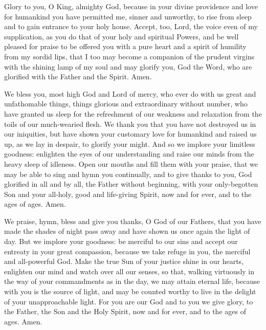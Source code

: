 
Glory to you, O King, almighty God, because in your divine providence and love for humankind you have permitted me, sinner and unworthy, to rise from sleep and to gain entrance to your holy house. Accept, too, Lord, the voice even of my supplication, as you do that of your holy and spiritual Powers, and be well pleased for praise to be offered you with a pure heart and a spirit of humility from my sordid lips, that I too may become a companion of the prudent virgins with the shining lamp of my soul and may glorify you, God the Word, who are glorified with the Father and the Spirit. Amen.



We bless you, most high God and Lord of mercy, who ever do with us great and unfathomable things, things glorious and extraordinary without number, who have granted us sleep for the refreshment of our weakness and relaxation from the toils of our much-wearied flesh. We thank you that you have not destroyed us in our iniquities, but have shown your customary love for humankind and raised us up, as we lay in despair, to glorify your might. And so we implore your limitless goodness: enlighten the eyes of our understanding and raise our minds from the heavy sleep of idleness. Open our mouths and fill them with your praise, that we may be able to sing and hymn you continually, and to give thanks to you, God glorified in all and by all, the Father without beginning, with your only-begotten Son and your all-holy, good and life-giving Spirit, now and for ever, and to the ages of ages. Amen.


We praise, hymn, bless and give you thanks, O God of our Fathers, that you have made the shades of night pass away and have shown us once again the light of day. But we implore your goodness: be merciful to our sins and accept our entreaty in your great compassion, because we take refuge in you, the merciful and all-powerful God. Make the true Sun of your justice shine in our hearts, enlighten our mind and watch over all our senses, so that, walking virtuously in the way of your commandments as in the day, we may attain eternal life, because with you is the source of light, and may be counted worthy to live in the delight of your unapproachable light. For you are our God and to you we give glory, to the Father, the Son and the Holy Spirit, now and for ever, and to the ages of ages. Amen.

